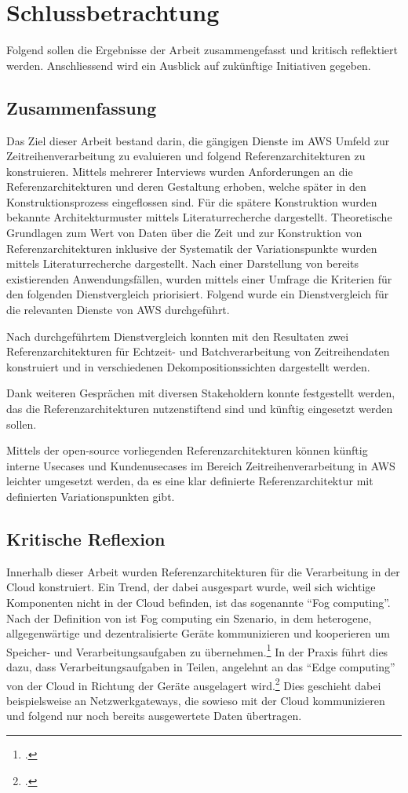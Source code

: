 \chapter{Schlussbetrachtung}
Folgend sollen die Ergebnisse der Arbeit zusammengefasst und kritisch reflektiert werden. Anschliessend wird ein Ausblick auf zukünftige Initiativen gegeben.
\section{Zusammenfassung}
Das Ziel dieser Arbeit bestand darin, die gängigen Dienste im \ac{AWS} Umfeld zur Zeitreihenverarbeitung zu evaluieren und folgend Referenzarchitekturen zu konstruieren. Mittels mehrerer Interviews wurden Anforderungen an die Referenzarchitekturen und deren Gestaltung erhoben, welche später in den Konstruktionsprozess eingeflossen sind. 
Für die spätere Konstruktion wurden bekannte Architekturmuster mittels Literaturrecherche dargestellt. Theoretische Grundlagen zum Wert von Daten über die Zeit und zur Konstruktion von Referenzarchitekturen inklusive der Systematik der Variationspunkte wurden mittels Literaturrecherche dargestellt. Nach einer Darstellung von bereits existierenden Anwendungsfällen, wurden mittels einer Umfrage die Kriterien für den folgenden Dienstvergleich priorisiert. Folgend wurde ein Dienstvergleich für die relevanten Dienste von \ac{AWS} durchgeführt.

Nach durchgeführtem Dienstvergleich konnten mit den Resultaten zwei Referenzarchitekturen für Echtzeit- und Batchverarbeitung von Zeitreihendaten konstruiert und in verschiedenen Dekompositionssichten dargestellt werden.

Dank weiteren Gesprächen mit diversen Stakeholdern konnte festgestellt werden, das die Referenzarchitekturen nutzenstiftend sind und künftig eingesetzt werden sollen.

Mittels der open-source vorliegenden Referenzarchitekturen können künftig interne Usecases und Kundenusecases im Bereich Zeitreihenverarbeitung in \ac{AWS} leichter umgesetzt werden, da es eine klar definierte Referenzarchitektur mit definierten Variationspunkten gibt.



\section{Kritische Reflexion}
Innerhalb dieser Arbeit wurden Referenzarchitekturen für die Verarbeitung in der Cloud konstruiert. Ein Trend, der dabei ausgespart wurde, weil sich wichtige Komponenten nicht in der Cloud befinden, ist das sogenannte \enquote{Fog computing}. Nach der Definition von \citeauthor{Vaquero.2014} ist Fog computing ein Szenario, in dem heterogene, allgegenwärtige und dezentralisierte Geräte kommunizieren und kooperieren um Speicher- und Verarbeitungsaufgaben zu übernehmen.\footcite[Vgl.][30\psq]{Vaquero.2014} In der Praxis führt dies dazu, dass Verarbeitungsaufgaben in Teilen, angelehnt an das \enquote{Edge computing} von der Cloud in Richtung der Geräte ausgelagert wird.\footcite[Vgl.][]{Bonomi.2012} Dies geschieht dabei beispielsweise an Netzwerkgateways, die sowieso mit der Cloud kommunizieren und folgend nur noch bereits ausgewertete Daten übertragen. 

